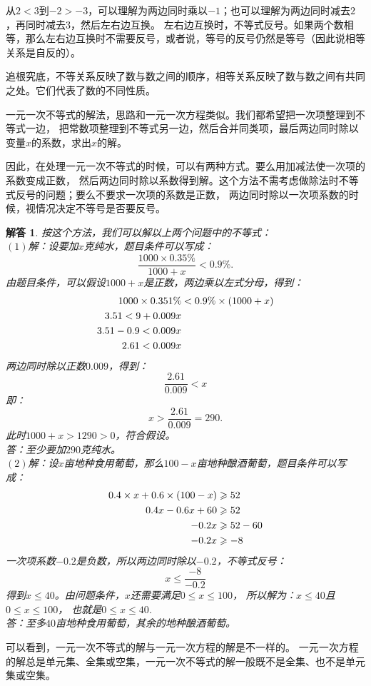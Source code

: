 \documentclass[12pt,UTF8]{ctexbook}
\newtheorem*{so}{解答}
\begin{document}
从$2 < 3$到$-2 > -3$，可以理解为两边同时乘以$-1$；也可以理解为两边同时减去$2$，再同时减去$3$，然后左右边互换。
左右边互换时，不等式反号。如果两个数相等，那么左右边互换时不需要反号，或者说，等号的反号仍然是等号（因此说相等关系是自反的）。

追根究底，不等关系反映了数与数之间的顺序，相等关系反映了数与数之间有共同之处。它们代表了数的不同性质。

一元一次不等式的解法，思路和一元一次方程类似。我们都希望把一次项整理到不等式一边，
把常数项整理到不等式另一边，然后合并同类项，最后两边同时除以变量$x$的系数，求出$x$的解。

因此，在处理一元一次不等式的时候，可以有两种方式。要么用加减法使一次项的系数变成正数，
然后两边同时除以系数得到解。这个方法不需考虑做除法时不等式反号的问题；要么不要求一次项的系数是正数，
两边同时除以一次项系数的时候，视情况决定不等号是否要反号。
\begin{so}
    按这个方法，我们可以解以上两个问题中的不等式：\\
    $(1)$解：设要加$x$克纯水，题目条件可以写成：
    $$ \frac{1000 \times 0.35\%}{1000 + x} < 0.9\%.$$
    由题目条件，可以假设$1000+x$是正数，两边乘以左式分母，得到：
    \begin{align}
        1000 \times 0.351\% &< 0.9\% \times (1000 + x) \notag \\
        3.51 < 9 + 0.009x \notag \\
        3.51 - 0.9 < 0.009x \notag \\
        2.61 < 0.009x \notag
    \end{align}
    两边同时除以正数$0.009$，得到：
    $$ \frac{2.61}{0.009} < x$$
    即：
    $$ x > \frac{2.61}{0.009} = 290.$$
    此时$1000+x > 1290 > 0$，符合假设。\\
    答：至少要加$290$克纯水。\\
    $(2)$解：设$x$亩地种食用葡萄，那么$100 - x$亩地种酿酒葡萄，题目条件可以写成：
    \begin{align}
        0.4 \times x + 0.6 \times (100 - x) &\geqslant 52 \notag \\
        0.4x - 0.6x + 60 &\geqslant 52 \notag \\
        -0.2x &\geqslant 52 - 60 \notag \\
        -0.2x &\geqslant -8 \notag
    \end{align}
    一次项系数$-0.2$是负数，所以两边同时除以$-0.2$，不等式反号：
    $$ x \leqslant \frac{-8}{-0.2}$$
    得到$x \leqslant 40$。由问题条件，$x$还需要满足$0 \leqslant x \leqslant 100$，
    所以解为：$x \leqslant 40$且$0 \leqslant x \leqslant 100$，
    也就是$0 \leqslant x \leqslant 40$.\\
    答：至多$40$亩地种食用葡萄，其余的地种酿酒葡萄。
\end{so}
可以看到，一元一次不等式的解与一元一次方程的解是不一样的。
一元一次方程的解总是单元集、全集或空集，一元一次不等式的解一般既不是全集、也不是单元集或空集。
\end{document}

